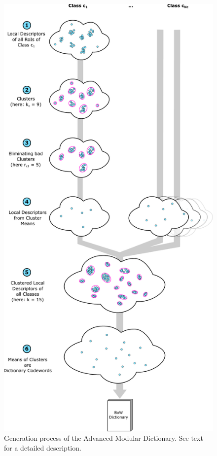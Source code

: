 \begin{figure}[btph]
  \centering
        \includegraphics[width=.65\linewidth]{gfx/amd_process}
        \caption{Generation process of the Advanced Modular Dictionary. See text for a detailed description.}
        \label{fig:amdProcess}
\end{figure}

